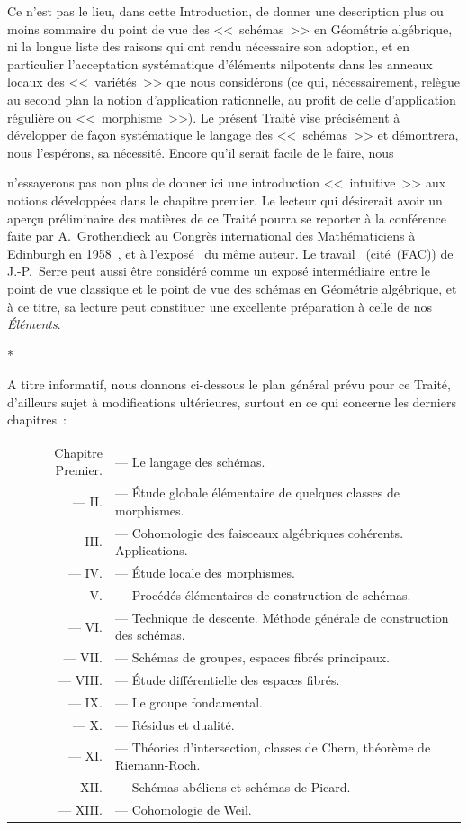 Ce n'est pas le lieu, dans cette Introduction, de donner une description plus ou moins sommaire du point de vue des <<~schémas~>> en Géométrie algébrique, ni la longue liste des raisons qui ont rendu nécessaire son adoption, et en particulier l'acceptation systématique d'éléments nilpotents dans les anneaux locaux des <<~variétés~>> que nous considérons (ce qui, nécessairement, relègue au second plan la notion d'application rationnelle, au profit de celle d'application régulière ou <<~morphisme~>>).
Le présent Traité vise précisément à développer de façon systématique le langage des <<~schémas~>> et démontrera, nous l'espérons, sa nécessité.
Encore qu'il serait facile de le faire, nous

n'essayerons pas non plus de donner ici une introduction <<~intuitive~>> aux notions développées dans le chapitre premier.
Le lecteur qui désirerait avoir un aperçu préliminaire des matières de ce Traité pourra se reporter à la conférence faite par A.~Grothendieck au Congrès international des Mathématiciens à Edinburgh en 1958~\cite{I-7}, et à l'exposé~\cite{I-8} du même auteur.
Le travail~\cite{I-14} (cité~(FAC)) de J.-P.~Serre peut aussi être considéré comme un exposé intermédiaire entre le point de vue classique et le point de vue des schémas en Géométrie algébrique, et à ce titre, sa lecture peut constituer une excellente préparation à celle de nos \emph{Éléments}.

\bigskip
\begin{center}*\quad*\quad*\end{center}
\bigskip

A titre informatif, nous donnons ci-dessous le plan général prévu pour ce Traité, d'ailleurs sujet à modifications ultérieures, surtout en ce qui concerne les derniers chapitres~:

\medskip
\begin{tabular}{rl}
  Chapitre Premier. & --- Le langage des schémas.\\
  --- II. & --- Étude globale élémentaire de quelques classes de morphismes.\\
  --- III. & --- Cohomologie des faisceaux algébriques cohérents. Applications.\\
  --- IV. & --- Étude locale des morphismes.\\
  --- V. & --- Procédés élémentaires de construction de schémas.\\
  --- VI. & --- Technique de descente. Méthode générale de construction des schémas.\\
  --- VII. & --- Schémas de groupes, espaces fibrés principaux.\\
  --- VIII. & --- Étude différentielle des espaces fibrés.\\
  --- IX. & --- Le groupe fondamental.\\
  --- X. & --- Résidus et dualité.\\
  --- XI. & --- Théories d'intersection, classes de Chern, théorème de Riemann-Roch.\\
  --- XII. & --- Schémas abéliens et schémas de Picard.\\
  --- XIII. & --- Cohomologie de Weil.\\
\end{tabular}
\medskip

